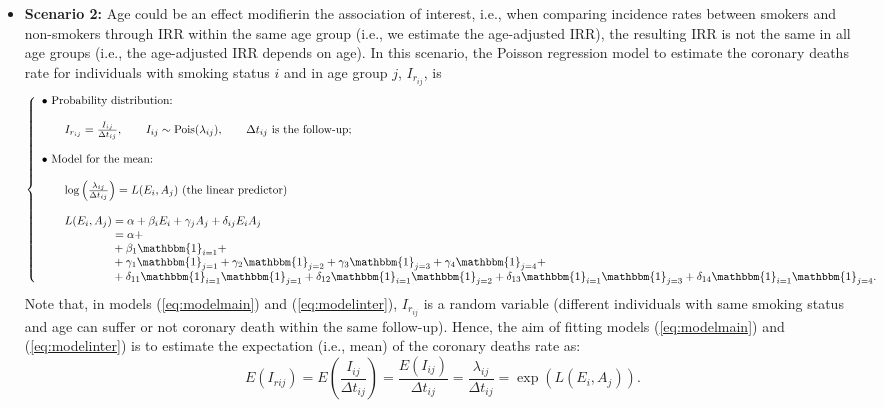 \documentclass[10pt,a4paper,twoside]{article}\usepackage[]{graphicx}\usepackage[]{xcolor}
\newcommand{\I}{\mathbbm{1}}
\begin{document}
\begin{itemize}
    \item \textbf{Scenario 2:} Age could be an effect modifier\footnotemark in the association of interest, i.e., when comparing incidence rates between smokers and non-smokers through IRR within the same age group (i.e., we estimate the age-adjusted IRR), the resulting IRR is not the same in all age groups (i.e., the age-adjusted IRR depends on age). In this scenario, the Poisson regression model to estimate the coronary deaths rate for individuals with smoking status $i$ and in age group $j$, $I_{r_{ij}}$, is
    \begin{equation}
\label{eq:modelinter}
\left\{
\begin{array}{l}
\bullet\ \text{Probability distribution:} \\ \\
\qquad
I_{r_{ij}}
=
\frac{I_{ij}}{\Delta t_{ij}},
\qquad
I_{ij} \sim  \text{Pois}(\lambda_{ij}),
\qquad
\Delta t_{ij}\text{ is the follow-up;}\\ \\
\bullet\ \text{Model for the mean:} \\ \\
\qquad
\log
\left(
\frac{\lambda_{ij}}{\Delta t_{ij}}
\right)
=
L(E_i, A_j) \text{ (the linear predictor)}\\ \\
\qquad
L(E_i, A_j)
 = 
\alpha + \beta_i E_i + \gamma_j A_j + \delta_{ij} E_i A_j\\
\phantom{
\qquad
L(E_i, A_j)
}
 = 
\alpha + \\
\phantom{
\qquad
L(E_i, A_j)
} + \beta_1 \I_{i=1} + \\
\phantom{
\qquad
L(E_i, A_j)
} + 
\gamma_{1} \I_{j=1} +
\gamma_{2} \I_{j=2} +
\gamma_{3} \I_{j=3} +
\gamma_{4} \I_{j=4} +\\
\phantom{
\qquad
L(E_i, A_j)
} + 
\delta_{11} \I_{i=1}\I_{j=1} +
\delta_{12} \I_{i=1}\I_{j=2} +
\delta_{13} \I_{i=1}\I_{j=3} +
\delta_{14} \I_{i=1}\I_{j=4}.
\end{array}
\right.
\end{equation}
Note that, in models (\ref{eq:modelmain}) and (\ref{eq:modelinter})\footnotemark, $I_{r_{ij}}$ is a random variable (different individuals with same smoking status and age can suffer or not coronary death within the same follow-up). 
Hence, the aim of fitting models (\ref{eq:modelmain}) and (\ref{eq:modelinter}) is to estimate the expectation (i.e., mean) of
the coronary deaths rate as:
\begin{equation*}
E(I_{rij}) = E\left(\frac{I_{ij}}{\Delta t_{ij}}\right)
= \frac{E(I_{ij})}{\Delta t_{ij}}
= \frac{\lambda_{ij}}{\Delta t_{ij}}
= \exp\left(L(E_i,A_j)\right).
\end{equation*}
\end{itemize}
\end{document}
